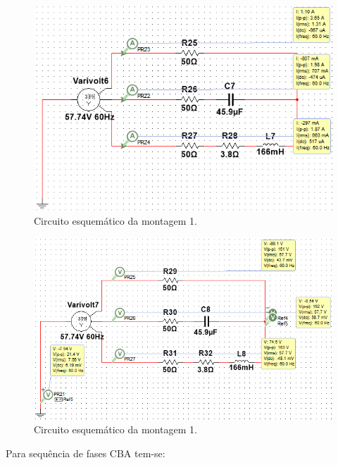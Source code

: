\documentclass[a4paper,12pt,oneside,openany,table,xcdraw]{article}
\begin{document}
\begin{figure}[H]
\centering
\includegraphics[width=13.5cm]{m2-esquema-abc-correntes}
\caption{Circuito esquemático da montagem 1.}
\label{m2:IL}
\end{figure}
\begin{figure}[H]
\centering
\includegraphics[width=13.5cm]{m2-esquema-abc-vf}
\caption{Circuito esquemático da montagem 1.}
\label{m1:VF}
\end{figure}

Para sequência de fases CBA tem-se: 
\end{document}
